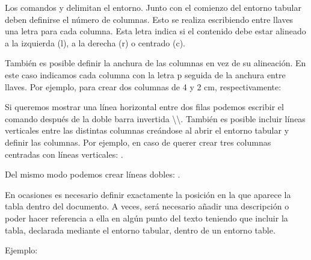 \documentclass[11pt, a4paper]{article}
\begin{document}
Los comandos  y  delimitan el entorno. Junto con el comienzo del entorno tabular deben definirse el número de columnas. Esto se realiza escribiendo entre llaves una letra para cada columna. Esta letra indica si el contenido debe estar alineado a la izquierda (l), a la derecha (r) o centrado (c).

También es posible definir la anchura de las columnas en vez de su alineación. En este caso indicamos cada columna con la letra p seguida de la anchura entre llaves. Por ejemplo, para crear dos columnas de 4 y 2 cm, respectivamente:


Si queremos mostrar una línea horizontal entre dos filas podemos escribir el comando  después de la doble barra invertida \textbackslash\textbackslash. También es posible incluir líneas verticales entre las distintas columnas creándose al abrir el entorno tabular y definir las columnas. Por ejemplo, en caso de querer crear tres columnas centradas con líneas verticales: .

Del mismo modo podemos crear líneas dobles: .

En ocasiones es necesario definir exactamente la posición en la que aparece la tabla dentro del documento. A veces, será necesario añadir una descripción o poder hacer referencia a ella en algún punto del texto teniendo que incluir la tabla, declarada mediante el entorno tabular, dentro de un entorno table. 

Ejemplo:











\end{document}
